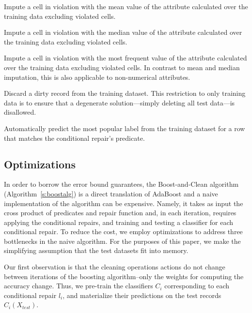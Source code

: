  Impute a cell in violation with the mean value of the attribute calculated over the training data excluding violated cells.


 Impute a cell in violation with the median value of the attribute calculated over the training data excluding violated cells.

 Impute a cell in violation with the most frequent value of the attribute calculated over the training data excluding violated cells.  In contrast to mean and median imputation, this is also applicable to non-numerical attributes.

 Discard a dirty record from the training dataset.  This restriction to only training data is to ensure that a degenerate solution---simply deleting all test data---is disallowed. 

 Automatically predict the most popular label from the training dataset for a row that matches the conditional repair's predicate.




\subsection{Optimizations}
In order to borrow the error bound guarantees, the Boost-and-Clean algorithm (Algorithm~\ref{s:boostalg}) is a direct translation of AdaBoost and a naive implementation of the algorithm can be expensive.  Namely, it takes as input the cross product of predicates and repair function and, in each iteration, requires applying the conditional repairs, and training and testing a classifier for each conditional repair.  To reduce the cost, we employ optimizations to address three bottlenecks in the naive algorithm.  For the purposes of this paper, we make the simplifying assumption that the test datasets fit into memory.

 Our first observation is that the cleaning operations actions do not change between iterations of the boosting algorithm--only the weights for computing the accuracy change.  Thus, we pre-train the classifiers $C_i$ corresponding to each conditional repair $l_i$, and materialize their predictions on the test records $C_i(X_{test})$.  

